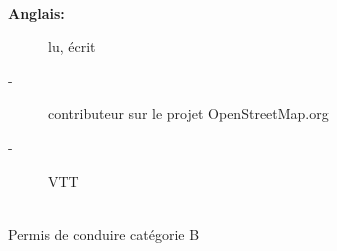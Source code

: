 \documentclass[11pt, oneside, a4paper, french]{article}
\begin{document}
\vspace{1cm}
%
%

\textbf{
  \Large{
  }
}\\

\begin{description}
  \item[\textbf{Anglais:}] lu, \'ecrit
\end{description} 

\vspace{1cm}

\textbf{
  \Large{
  }
}

\begin{description}
  \item[-] contributeur sur le projet OpenStreetMap.org
  \item[-] VTT
\end{description}

\vspace{1cm}

\textbf{
  \Large{
  }
}\\

\noindent
Permis de conduire cat\'egorie B
\end{document}
